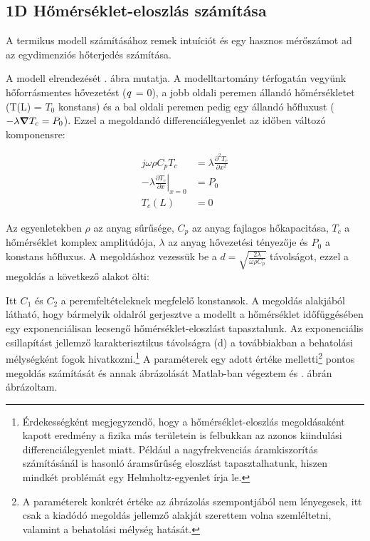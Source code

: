 
\subsection{1D Hőmérséklet-eloszlás számítása}

A termikus modell számításához remek intuíciót és egy hasznos mérőszámot ad az egydimenziós hőterjedés számítása.


A modell elrendezését . ábra mutatja. A modelltartomány térfogatán vegyünk hőforrásmentes hővezetést ($\it{q}$ = 0), a jobb oldali peremen állandó hőmérsékletet (T(L) = $T_0$ konstans) és a bal oldali peremen pedig egy állandó hőfluxust ($-\lambda \grad T_c = P_0$). Ezzel a megoldandó differenciálegyenlet az időben változó komponensre:

\begin{equation}\label{eqn:1d_thermal}
    \begin{split}
        j \omega \rho C_p T_c &= \lambda \frac{\partial^2 T_c}{\partial x^2} \\
        -\lambda \left.\frac{\partial T_c}{\partial x}\right|_{x = 0} &= P_0 \\
        T_c(L) &= 0
    \end{split}
\end{equation}

Az egyenletekben $\rho$ az anyag sűrűsége, $C_p$ az anyag fajlagos hőkapacitása, $T_c$ a hőmérséklet komplex amplitúdója, $\lambda$ az anyag hővezetési tényezője és $P_0$ a konstans hőfluxus. A megoldáshoz vezessük be a $d = \sqrt{\frac{2\lambda}{\omega \rho C_p}}$ távolságot, ezzel a megoldás a következő alakot ölti:


Itt $C_1$ és $C_2$ a peremfeltételeknek megfelelő konstansok. A megoldás alakjából látható, hogy bármelyik oldalról gerjesztve a modellt a hőmérséklet időfüggésében egy exponenciálisan lecsengő hőmérséklet-eloszlást tapasztalunk. Az exponenciális csillapítást jellemző karakterisztikus távolságra (d) a továbbiakban a behatolási mélységként fogok hivatkozni.\footnote{Érdekességként megjegyzendő, hogy a hőmérséklet-eloszlás megoldásaként kapott eredmény a fizika más területein is felbukkan az azonos kiindulási differenciálegyenlet miatt. Például a nagyfrekvenciás áramkiszorítás számításánál is hasonló áramsűrűség eloszlást tapasztalhatunk, hiszen mindkét problémát egy Helmholtz-egyenlet írja le.} A paraméterek egy adott értéke melletti\footnote{A paraméterek konkrét értéke az ábrázolás szempontjából nem lényegesek, itt csak a kiadódó megoldás jellemző alakját szerettem volna szemléltetni, valamint a behatolási mélység hatását.} pontos megoldás számítását és annak ábrázolását Matlab-ban végeztem és . ábrán ábrázoltam.

